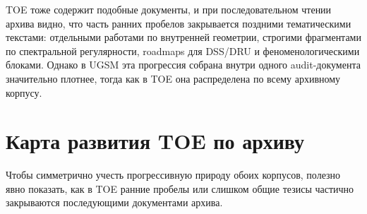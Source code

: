 \documentclass[12pt,a4paper]{article}
\begin{document}
TOE тоже содержит подобные документы, и при последовательном чтении архива видно, что часть ранних пробелов закрывается поздними тематическими текстами: отдельными работами по внутренней геометрии, строгими фрагментами по спектральной регулярности, roadmaps для DSS/DRU и феноменологическими блоками. Однако в UGSM эта прогрессия собрана внутри одного audit-документа значительно плотнее, тогда как в TOE она распределена по всему архивному корпусу.


\section{Карта развития TOE по архиву}

Чтобы симметрично учесть прогрессивную природу обоих корпусов, полезно явно показать, как в TOE ранние пробелы или слишком общие тезисы частично закрываются последующими документами архива.
\end{document}
